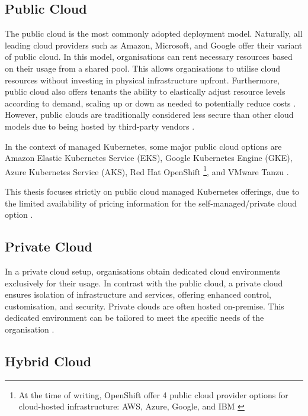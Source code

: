 \subsection{Public Cloud}

The public cloud is the most commonly adopted deployment model. Naturally, all leading cloud providers such as Amazon, Microsoft, and Google offer their variant of public cloud. In this model, organisations can rent necessary resources based on their usage from a shared pool. This allows organisations to utilise cloud resources without investing in physical infrastructure upfront. Furthermore, public cloud also offers tenants the ability to elastically adjust resource levels according to demand, scaling up or down as needed to potentially reduce costs \cite{suleiman2012understanding}. However, public clouds are traditionally considered less secure than other cloud models due to being hosted by third-party vendors \cite{jadejaCloudComputingConcepts2012}. 

In the context of managed Kubernetes, some major public cloud options are Amazon Elastic Kubernetes Service (EKS), Google Kubernetes Engine (GKE), Azure Kubernetes Service (AKS), Red Hat OpenShift \footnote{At the time of writing, OpenShift offer 4 public cloud provider options for cloud-hosted infrastructure: AWS, Azure, Google, and IBM \cite{OpenShiftContainerPlatform}}, and VMware Tanzu \cite{AmazonEKSCustomers, maEurekaHumanLevelReward2023, nickomangAzureKubernetesService, redhatinc.RedHatOpenShift, VMwareTanzuPlatform}.

This thesis focuses strictly on public cloud managed Kubernetes offerings, due to the limited availability of pricing information for the self-managed/private cloud option \cite{redhatinc.RedHatOpenShift}.

\subsection{Private Cloud}

In a private cloud setup, organisations obtain dedicated cloud environments exclusively for their usage. In contrast with the public cloud, a private cloud ensures isolation of infrastructure and services, offering enhanced control, customisation, and security. Private clouds are often hosted on-premise. This dedicated environment can be tailored to meet the specific needs of the organisation \cite{jadejaCloudComputingConcepts2012}.

\subsection{Hybrid Cloud}

